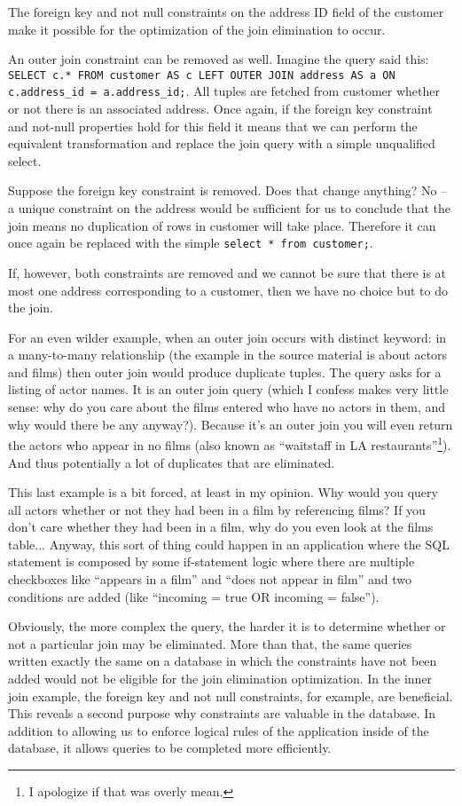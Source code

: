\documentclass[a4paper]{report}
\begin{document}
The foreign key and not null constraints on the address ID field of the customer make it possible for the optimization of the join elimination to occur.

An outer join constraint can be removed as well. Imagine the query said this: \texttt{SELECT c.* FROM customer AS c LEFT OUTER JOIN address AS a ON c.address\_id = a.address\_id;}. All tuples are fetched from customer whether or not there is an associated address. Once again, if the foreign key constraint and not-null properties hold for this field it means that we can perform the equivalent transformation and replace the join query with a simple unqualified select. 

Suppose the foreign key constraint is removed. Does that change anything? No -- a unique constraint on the address would be sufficient for us to conclude that the join means no duplication of rows in customer will take place. Therefore it can once again be replaced with the simple \texttt{select * from customer;}.

If, however, both constraints are removed and we cannot be sure that there is at most one address corresponding to a customer, then we have no choice but to do the join.

For an even wilder example, when an outer join occurs with distinct keyword: in a many-to-many relationship (the example in the source material is about actors and films) then outer join would produce duplicate tuples. The query asks for a listing of actor names. It is an outer join query (which I confess makes very little sense: why do you care about the films entered who have no actors in them, and why would there be any anyway?). Because it's an outer join you will even return the actors who appear in no films (also known as ``waitstaff in LA restaurants''\footnote{I apologize if that was overly mean.}). And thus potentially a lot of duplicates that are eliminated. 

This last example is a bit forced, at least in my opinion. Why would you query all actors whether or not they had been in a film by referencing films? If you don't care whether they had been in a film, why do you even look at the films table... Anyway, this sort of thing could happen in an application where the SQL statement is composed by some if-statement logic where there are multiple checkboxes like ``appears in a film'' and ``does not appear in film'' and two conditions are added (like ``incoming = true OR incoming = false'').

Obviously, the more complex the query, the harder it is to determine whether or not a particular join may be eliminated. More than that, the same queries written exactly the same on a database in which the constraints have not been added would not be eligible for the join elimination optimization. In the inner join example, the foreign key and not null constraints, for example, are beneficial. This reveals a second purpose why constraints are valuable in the database. In addition to allowing us to enforce logical rules of the application inside of the database, it allows queries to be completed more efficiently.
\end{document}
